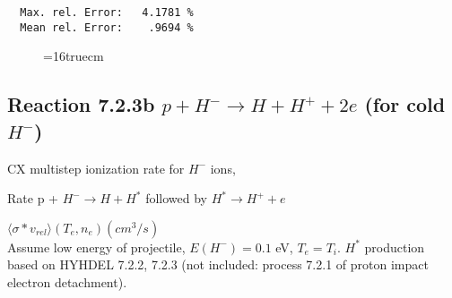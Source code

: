 \documentclass[12pt,dvipdfmx]{article}
\begin{document}
\begin{small}
\begin{verbatim}
  Max. rel. Error:   4.1781 %
  Mean rel. Error:    .9694 %
\end{verbatim}\end{small}
\begin{figure} \label{7.2.3a}
\epsfxsize=16truecm
\end{figure}
\newpage

\subsection{
Reaction 7.2.3b   $ p + H^{-} \rightarrow  H + H^+ + 2e$ (for cold $H^-$)
}

  CX multistep ionization rate for $H^-$ ions,
 \cite{kn:Sawada}

  Rate p + $H^- \rightarrow H + H^*$ followed by $H^* \rightarrow H^+
+e$

$  \langle \sigma*v_{rel} \rangle(T_e,n_e) (cm^3/s)$ \\
Assume low energy of projectile, $E(H^-)=0.1$ eV, $T_e = T_i$.
$H^*$ production based on HYHDEL 7.2.2, 7.2.3 (not included: process 7.2.1 of proton impact electron detachment).
\end{document}

